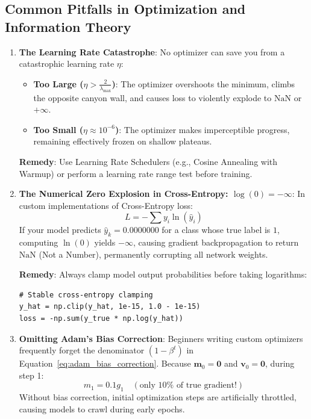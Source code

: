\subsection{Common Pitfalls in Optimization and Information Theory}\label{subsec:opt_pitfalls}

\begin{warning}
\begin{enumerate}
    \item \textbf{The Learning Rate Catastrophe}:
    No optimizer can save you from a catastrophic learning rate $\eta$:
    \begin{itemize}
        \item \textbf{Too Large ($\eta > \frac{2}{\lambda_{\max}}$)}: The optimizer overshoots the minimum, climbs the opposite canyon wall, and causes loss to violently explode to $\text{NaN}$ or $+\infty$.
        \item \textbf{Too Small ($\eta \approx 10^{-6}$)}: The optimizer makes imperceptible progress, remaining effectively frozen on shallow plateaus.
    \end{itemize}
    \textbf{Remedy}: Use Learning Rate Schedulers (e.g., Cosine Annealing with Warmup) or perform a learning rate range test before training.

    \item \textbf{The Numerical Zero Explosion in Cross-Entropy: $\log(0) = -\infty$}:
    In custom implementations of Cross-Entropy loss:
    \begin{equation*}
    L = -\sum y_i \ln(\hat{y}_i)
    \end{equation*}
    If your model predicts $\hat{y}_k = 0.0000000$ for a class whose true label is $1$, computing $\ln(0)$ yields $-\infty$, causing gradient backpropagation to return $\text{NaN}$ (Not a Number), permanently corrupting all network weights.
    
    \textbf{Remedy}: Always clamp model output probabilities before taking logarithms:
    \begin{lstlisting}[style=pythonstyle]
# Stable cross-entropy clamping
y_hat = np.clip(y_hat, 1e-15, 1.0 - 1e-15)
loss = -np.sum(y_true * np.log(y_hat))
    \end{lstlisting}

    \item \textbf{Omitting Adam's Bias Correction}:
    Beginners writing custom optimizers frequently forget the denominator $(1 - \beta^t)$ in Equation~\eqref{eq:adam_bias_correction}. Because $\mathbf{m}_0 = \mathbf{0}$ and $\mathbf{v}_0 = \mathbf{0}$, during step 1:
    \begin{equation*}
    m_1 = 0.1 g_1 \quad (\text{only } 10\% \text{ of true gradient!})
    \end{equation*}
    Without bias correction, initial optimization steps are artificially throttled, causing models to crawl during early epochs.


\end{enumerate}
\end{warning}
